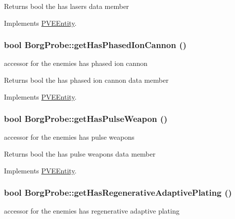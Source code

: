 \begin{DoxyReturn}{Returns}
bool the has lasers data member 
\end{DoxyReturn}


Implements \hyperlink{classPVEEntity}{PVEEntity}.

\hypertarget{classBorgProbe_a45245995e7fe90e03f64f63c999339b5}{
\subsubsection[{getHasPhasedIonCannon}]{\setlength{\rightskip}{0pt plus 5cm}bool BorgProbe::getHasPhasedIonCannon ()}}
\label{db/deb/classBorgProbe_a45245995e7fe90e03f64f63c999339b5}
accessor for the enemies has phased ion cannon

\begin{DoxyReturn}{Returns}
bool the has phased ion cannon data member 
\end{DoxyReturn}


Implements \hyperlink{classPVEEntity}{PVEEntity}.

\hypertarget{classBorgProbe_a60085d6bf6d31b28bfb60eeedca1c711}{
\subsubsection[{getHasPulseWeapon}]{\setlength{\rightskip}{0pt plus 5cm}bool BorgProbe::getHasPulseWeapon ()}}
\label{db/deb/classBorgProbe_a60085d6bf6d31b28bfb60eeedca1c711}
accessor for the enemies has pulse weapons

\begin{DoxyReturn}{Returns}
bool the has pulse weapons data member 
\end{DoxyReturn}


Implements \hyperlink{classPVEEntity}{PVEEntity}.

\hypertarget{classBorgProbe_a5c21dac867e41d71305cce22f6519586}{
\subsubsection[{getHasRegenerativeAdaptivePlating}]{\setlength{\rightskip}{0pt plus 5cm}bool BorgProbe::getHasRegenerativeAdaptivePlating ()}}
\label{db/deb/classBorgProbe_a5c21dac867e41d71305cce22f6519586}
accessor for the enemies has regenerative adaptive plating

